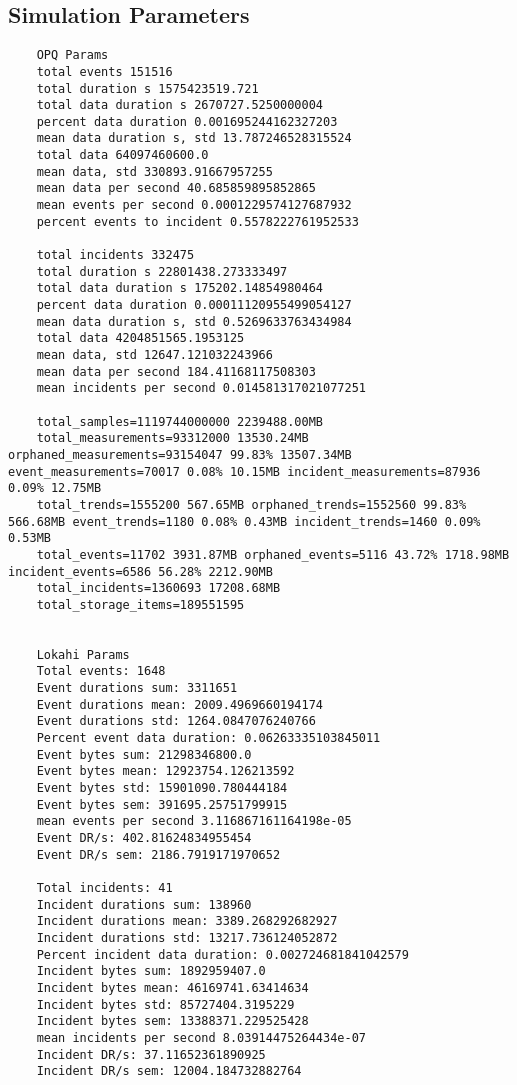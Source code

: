 \subsection{Simulation Parameters}\label{appendix:simulation_parameters}
\begin{verbatim}
	OPQ Params
	total events 151516
	total duration s 1575423519.721
	total data duration s 2670727.5250000004
	percent data duration 0.001695244162327203
	mean data duration s, std 13.787246528315524
	total data 64097460600.0
	mean data, std 330893.91667957255
	mean data per second 40.685859895852865
	mean events per second 0.0001229574127687932
	percent events to incident 0.5578222761952533

	total incidents 332475
	total duration s 22801438.273333497
	total data duration s 175202.14854980464
	percent data duration 0.00011120955499054127
	mean data duration s, std 0.5269633763434984
	total data 4204851565.1953125
	mean data, std 12647.121032243966
	mean data per second 184.41168117508303
	mean incidents per second 0.014581317021077251

	total_samples=1119744000000 2239488.00MB
	total_measurements=93312000 13530.24MB orphaned_measurements=93154047 99.83% 13507.34MB event_measurements=70017 0.08% 10.15MB incident_measurements=87936 0.09% 12.75MB
	total_trends=1555200 567.65MB orphaned_trends=1552560 99.83% 566.68MB event_trends=1180 0.08% 0.43MB incident_trends=1460 0.09% 0.53MB
	total_events=11702 3931.87MB orphaned_events=5116 43.72% 1718.98MB incident_events=6586 56.28% 2212.90MB
	total_incidents=1360693 17208.68MB
	total_storage_items=189551595


	Lokahi Params
	Total events: 1648
	Event durations sum: 3311651
	Event durations mean: 2009.4969660194174
	Event durations std: 1264.0847076240766
	Percent event data duration: 0.06263335103845011
	Event bytes sum: 21298346800.0
	Event bytes mean: 12923754.126213592
	Event bytes std: 15901090.780444184
	Event bytes sem: 391695.25751799915
	mean events per second 3.116867161164198e-05
	Event DR/s: 402.81624834955454
	Event DR/s sem: 2186.7919171970652

	Total incidents: 41
	Incident durations sum: 138960
	Incident durations mean: 3389.268292682927
	Incident durations std: 13217.736124052872
	Percent incident data duration: 0.002724681841042579
	Incident bytes sum: 1892959407.0
	Incident bytes mean: 46169741.63414634
	Incident bytes std: 85727404.3195229
	Incident bytes sem: 13388371.229525428
	mean incidents per second 8.03914475264434e-07
	Incident DR/s: 37.11652361890925
	Incident DR/s sem: 12004.184732882764


\end{verbatim}
